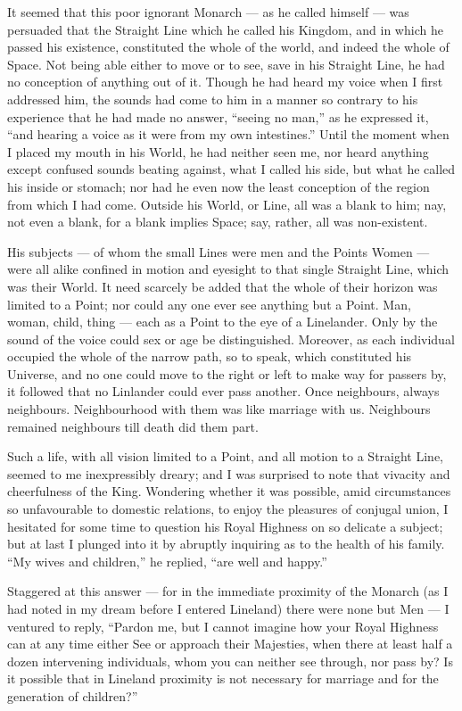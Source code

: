 \documentclass[12pt, a4paper, oneside]{memoir}
\begin{document}
It seemed that this poor ignorant Monarch --- as he called himself --- was
persuaded that the Straight Line which he called his Kingdom, and in which he
passed his existence, constituted the whole of the world, and indeed the whole
of Space. Not being able either to move or to see, save in his Straight Line,
he had no conception of anything out of it. Though he had heard my voice when
I first addressed him, the sounds had come to him in a manner so contrary to
his experience that he had made no answer, ``seeing no man,'' as he expressed
it, ``and hearing a voice as it were from my own intestines.'' Until the moment
when I placed my mouth in his World, he had neither seen me, nor heard
anything except confused sounds beating against, what I called his side, but
what he called his inside or stomach; nor had he even now the least conception
of the region from which I had come. Outside his World, or Line, all was a
blank to him; nay, not even a blank, for a blank implies Space; say, rather,
all was non-existent.

His subjects --- of whom the small Lines were men and the Points Women --- were
all alike confined in motion and eyesight to that single Straight Line, which
was their World. It need scarcely be added that the whole of their horizon was
limited to a Point; nor could any one ever see anything but a Point. Man,
woman, child, thing --- each as a Point to the eye of a Linelander. Only by the
sound of the voice could sex or age be distinguished. Moreover, as each
individual occupied the whole of the narrow path, so to speak, which
constituted his Universe, and no one could move to the right or left to make
way for passers by, it followed that no Linlander could ever pass another.
Once neighbours, always neighbours. Neighbourhood with them was like marriage
with us. Neighbours remained neighbours till death did them part.

Such a life, with all vision limited to a Point, and all motion to a Straight
Line, seemed to me inexpressibly dreary; and I was surprised to note that
vivacity and cheerfulness of the King. Wondering whether it was possible, amid
circumstances so unfavourable to domestic relations, to enjoy the pleasures of
conjugal union, I hesitated for some time to question his Royal Highness on so
delicate a subject; but at last I plunged into it by abruptly inquiring as to
the health of his family. ``My wives and children,'' he replied, ``are well and
happy.''

Staggered at this answer --- for in the immediate proximity of the Monarch (as I
had noted in my dream before I entered Lineland) there were none but Men --- I
ventured to reply, ``Pardon me, but I cannot imagine how your Royal Highness
can at any time either See or approach their Majesties, when there at least
half a dozen intervening individuals, whom you can neither see through, nor
pass by? Is it possible that in Lineland proximity is not necessary for
marriage and for the generation of children?''
\end{document}
